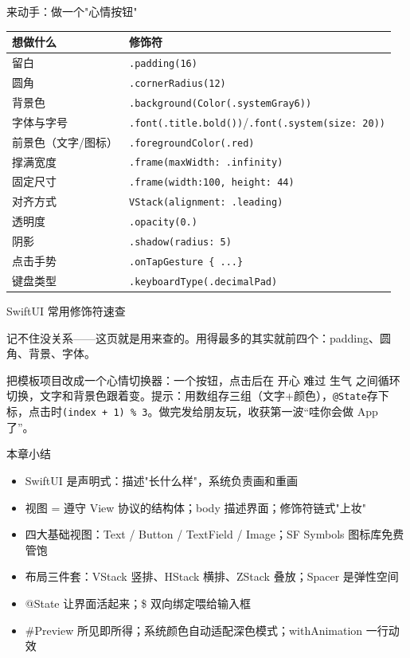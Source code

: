 \begin{tcbpractice}{来动手：做一个"心情按钮"}

\begin{center}
\begin{tabularx}{\linewidth}{|X|X|}
\hline
\textbf{想做什么} & \textbf{修饰符} \tabularnewline
\hline
留白 & \texttt{.\allowbreak padding(16)} \tabularnewline
圆角 & \texttt{.\allowbreak cornerRadius(12)} \tabularnewline
背景色 & \texttt{.\allowbreak background(Color(.\allowbreak systemGray6))} \tabularnewline
字体与字号 & \texttt{.\allowbreak font(.\allowbreak title.\allowbreak bold())}/\texttt{.\allowbreak font(.\allowbreak system(size: 20))} \tabularnewline
前景色（文字/图标） & \texttt{.\allowbreak foregroundColor(.\allowbreak red)} \tabularnewline
撑满宽度 & \texttt{.\allowbreak frame(maxWidth: .\allowbreak infinity)} \tabularnewline
固定尺寸 & \texttt{.\allowbreak frame(width:100, height: 44)} \tabularnewline
对齐方式 & \texttt{VStack(alignment: .\allowbreak leading)} \tabularnewline
透明度 & \texttt{.\allowbreak opacity(0.\allowbreak 6)} \tabularnewline
阴影 & \texttt{.\allowbreak shadow(radius: 5)} \tabularnewline
点击手势 & \texttt{.\allowbreak onTapGesture \{ .\allowbreak .\allowbreak .\allowbreak  \}} \tabularnewline
键盘类型 & \texttt{.\allowbreak keyboardType(.\allowbreak decimalPad)} \tabularnewline
\hline
\end{tabularx}
\end{center}

\begin{center}\small\color{gray}SwiftUI 常用修饰符速查\end{center}

记不住没关系——这页就是用来查的。用得最多的其实就前四个：padding、圆角、背景、字体。

把模板项目改成一个心情切换器：一个按钮，点击后在 开心 难过 生气 之间循环切换，文字和背景色跟着变。提示：用数组存三组（文字+颜色），\texttt{@State}存下标，点击时\texttt{(index + 1) \% 3}。做完发给朋友玩，收获第一波“哇你会做 App 了”。

\end{tcbpractice}

\begin{tcbsummary}{本章小结}
\begin{itemize}
  \item SwiftUI 是声明式：描述"长什么样"，系统负责画和重画
  \item 视图 = 遵守 View 协议的结构体；body 描述界面；修饰符链式"上妆"
  \item 四大基础视图：Text / Button / TextField / Image；SF Symbols 图标库免费管饱
  \item 布局三件套：VStack 竖排、HStack 横排、ZStack 叠放；Spacer 是弹性空间
  \item @State 让界面活起来；\$ 双向绑定喂给输入框
  \item \#Preview 所见即所得；系统颜色自动适配深色模式；withAnimation 一行动效
\end{itemize}

\end{tcbsummary}
